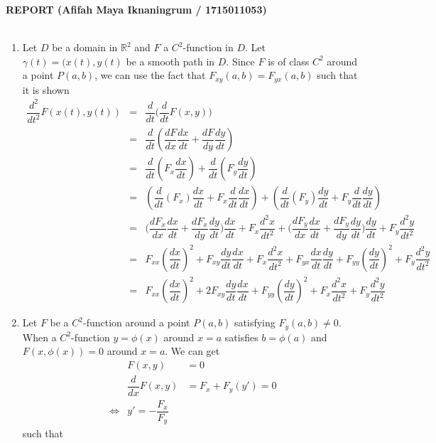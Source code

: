 \documentclass[a4paper,10pt]{article}
\newcommand{\R}{\mathbb{R}}
\begin{document}
\newpage
\textbf{REPORT (Afifah Maya Iknaningrum / 1715011053)}\\ \\


\begin{enumerate}
	\item Let $ D $ be a domain in $ \R^2 $ and $ F $ a $ C^2 $-function in $ D $. Let $ \gamma(t) = (x(t),y(t) $ be a smooth path in $ D $. Since $ F $ is of class $ C^2 $ around a point $ P(a,b ) $, we can use the fact that $ F_{xy}(a,b) = F_{yx}(a,b) $ such that it is shown
	\begin{eqnarray}\nonumber
	\dfrac{d^2}{dt^2}F(x(t),y(t)) &=& \dfrac{d}{dt}\big(\dfrac{d}{dt}F(x,y)\big)\\ \nonumber
	&=& \dfrac{d}{dt} (\dfrac{dF}{dx} \dfrac{dx}{dt}+\dfrac{dF}{dy} \dfrac{dy}{dt}) \\ \nonumber
	&=& \dfrac{d}{dt} (F_{x} \dfrac{dx}{dt}) + \dfrac{d}{dt}(F_{y} \dfrac{dy}{dt}) \\ \nonumber
	&=& ( \dfrac{d}{dt}(F_{x}) \dfrac{dx}{dt} + F_{x} \dfrac{d}{dt} \dfrac{dx}{dt}  ) + ( \dfrac{d}{dt}(F_{y}) \dfrac{dy}{dt} + F_{y} \dfrac{d}{dt} \dfrac{dy}{dt}  ) \\ \nonumber
	&=& \big( \dfrac{dF_{x}}{dx} \dfrac{dx}{dt} + \dfrac{dF_{x}}{dy} \dfrac{dy}{dt} \big) \dfrac{dx}{dt} + F_{x} \dfrac{d^2x}{dt^2} + \big( \dfrac{dF_{y}}{dx} \dfrac{dx}{dt} + \dfrac{dF_{y}}{dy} \dfrac{dy}{dt} \big) \dfrac{dy}{dt} + F_{y} \dfrac{d^2y}{dt^2} \\ \nonumber
	&=& F_{xx}(\dfrac{dx}{dt})^2 + F_{xy} \dfrac{dy}{dt} \dfrac{dx}{dt} + F_{x} \dfrac{d^2x}{dt^2} + F_{yx}\dfrac{dx}{dt} \dfrac{dy}{dt}  + F_{yy}(\dfrac{dy}{dt})^2 + F_{y} \dfrac{d^2y}{dt^2} \\ \nonumber
	&=& F_{xx}(\dfrac{dx}{dt})^2 + 2F_{xy} \dfrac{dy}{dt} \dfrac{dx}{dt} + F_{yy}(\dfrac{dy}{dt})^2 + F_{x} \dfrac{d^2x}{dt^2} + F_{y} \dfrac{d^2y}{dt^2}
	\end{eqnarray}
	\item Let $ F $ be a $ C^2 $-function around a point $ P(a,b) $ satisfying $ F_{y}(a,b)\neq 0 $. When a $ C^2 $-function $ y=\phi(x) $ around $ x=a $ satisfies $ b=\phi(a) $ and $ F(x,\phi(x)) = 0$ around $ x=a $. We can get
	\begin{eqnarray}\nonumber
	&F(x,y) &=0 \\
	&\dfrac{d}{dx} F(x,y) &= F_{x} + F_{y}(y') = 0 \\ \nonumber
	\Leftrightarrow & y' = -\dfrac{F_{x}}{F_{y}}
	\end{eqnarray}
	such that 

\end{enumerate}
\end{document}
